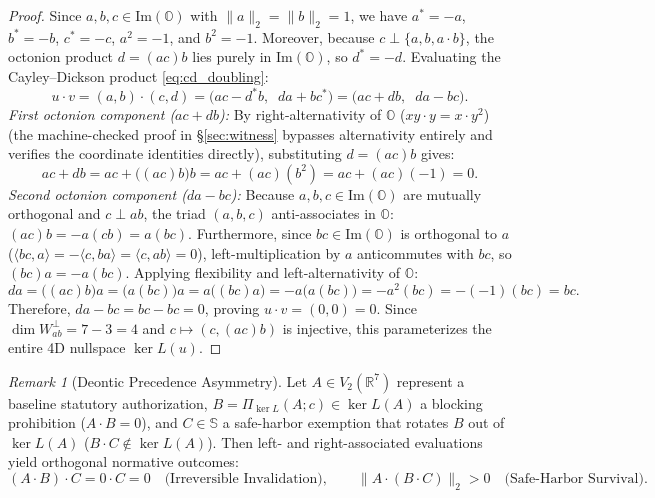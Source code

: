 \documentclass[11pt,a4paper]{article}
\theoremstyle{definition}
\theoremstyle{remark}
\newtheorem{remark}[theorem]{Remark}
\newcommand{\R}{\mathbb{R}}
\newcommand{\Oc}{\mathbb{O}}
\newcommand{\Se}{\mathbb{S}}
\newcommand{\ImPart}{\mathrm{Im}}
\newcommand{\PiNull}{\Pi_{\ker L}}
\begin{document}
\begin{proof}
Since $a, b, c \in \ImPart(\Oc)$ with $\|a\|_2 = \|b\|_2 = 1$, we have $a^* = -a$, $b^* = -b$, $c^* = -c$, $a^2 = -1$, and $b^2 = -1$. Moreover, because $c \perp \{a, b, a \cdot b\}$, the octonion product $d = (a c) b$ lies purely in $\ImPart(\Oc)$, so $d^* = -d$. Evaluating the Cayley--Dickson product \eqref{eq:cd_doubling}:
\[
u \cdot v = (a, b) \cdot (c, d) = \big(a c - d^* b, \;\; d a + b c^*\big) = \big(a c + d b, \;\; d a - b c\big).
\]
\textit{First octonion component ($a c + d b$):} By right-alternativity of $\Oc$ ($x y \cdot y = x \cdot y^2$) \cite{Schafer1966} (the machine-checked proof in \S\ref{sec:witness} bypasses alternativity entirely and verifies the coordinate identities directly), substituting $d = (a c) b$ gives:
\[
a c + d b = a c + \big((a c) b\big) b = a c + (a c)(b^2) = a c + (a c)(-1) = 0.
\]
\textit{Second octonion component ($d a - b c$):} Because $a, b, c \in \ImPart(\Oc)$ are mutually orthogonal and $c \perp a b$, the triad $(a, b, c)$ anti-associates in $\Oc$: $(a c) b = -a(c b) = a(b c)$. Furthermore, since $b c \in \ImPart(\Oc)$ is orthogonal to $a$ ($\langle b c, a \rangle = -\langle c, b a \rangle = \langle c, a b \rangle = 0$), left-multiplication by $a$ anticommutes with $b c$, so $(b c) a = -a(b c)$. Applying flexibility and left-alternativity of $\Oc$:
\[
d a = \big((a c) b\big) a = \big(a(b c)\big) a = a\big((b c) a\big) = -a\big(a(b c)\big) = -a^2 (b c) = -(-1)(b c) = b c.
\]
Therefore, $d a - b c = b c - b c = 0$, proving $u \cdot v = (0, 0) = 0$. Since $\dim W_{ab}^\perp = 7 - 3 = 4$ and $c \mapsto (c, (a c)b)$ is injective, this parameterizes the entire 4D nullspace $\ker L(u)$.
\end{proof}

\begin{remark}[Deontic Precedence Asymmetry]
\label{cor:precedence}
Let $A \in V_2(\R^7)$ represent a baseline statutory authorization, $B = \PiNull(A; c) \in \ker L(A)$ a blocking prohibition ($A \cdot B = 0$), and $C \in \Se$ a safe-harbor exemption that rotates $B$ out of $\ker L(A)$ ($B \cdot C \notin \ker L(A)$). Then left- and right-associated evaluations yield orthogonal normative outcomes:
\begin{equation}
\label{eq:precedence_asymmetry}
(A \cdot B) \cdot C = 0 \cdot C = 0 \quad \text{(Irreversible Invalidation)}, \qquad \|A \cdot (B \cdot C)\|_2 > 0 \quad \text{(Safe-Harbor Survival)}.
\end{equation}
\end{remark}
\end{document}
